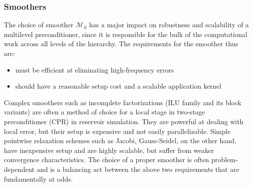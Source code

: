 \subsubsection{Smoothers}
\label{subsec:par_kernels_apply_smoothers}

The choice of smoother $\mathcal{M}_S$ has a major impact on robustness and scalability of a multilevel preconditioner, since it is responsible for the bulk of the computational work across all levels of the hierarchy.   The requirements for the smoother thus are:
\begin{itemize}
    \item must be efficient at eliminating high-frequency errors
    \item should have a reasonable setup cost and a scalable application kernel
\end{itemize}
Complex smoothers such as incomplete factorizations (ILU family and its block variants) are often a method of choice for a local stage in two-stage preconditioner (CPR) in reservoir simulation.   They are powerful at dealing with local error, but their setup is expensive and not easily parallelizable.   Simple pointwise relaxation schemes such as Jacobi, Gauss-Seidel, on the other hand, have inexpensive setup and are highly scalable, but suffer from weaker convergence characteristics.   The choice of a proper smoother is often problem-dependent and is a balancing act between the above two requirements that are fundamentally at odds.

